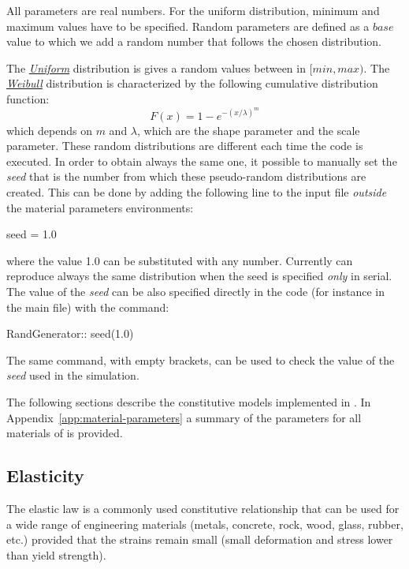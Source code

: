 All parameters are real numbers. For the uniform distribution, minimum
and maximum values have to be specified.
Random parameters are defined as a $base$ value to which we add a random number
that follows the chosen distribution.

The
\href{http://en.wikipedia.org/wiki/Uniform\_distribution\_(continuous)}{\emph{Uniform}}
distribution is gives a random values between in $[min, max)$. The
\href{http://en.wikipedia.org/wiki/Weibull\_distribution}{\emph{Weibull}}
distribution is characterized by the following cumulative distribution
function:
\begin{equation}
  F(x) = 1- e^{-\left({x/\lambda}\right)^m}
\end{equation}
which depends on $m$ and $\lambda$, which are the shape parameter and
the scale parameter. These random distributions are different each
time the code is executed. In order to obtain always the same one, it
possible to manually set the \emph{seed} that is the number from which
these pseudo-random distributions are created. This can be done by
adding the following line to the input file \emph{outside} the
material parameters environments:
\begin{cpp}
  seed = 1.0
\end{cpp}
where the value 1.0 can be substituted with any number. Currently
\akantu can reproduce always the same distribution when the seed is
specified \emph{only} in serial. The value of the \emph{seed} can be
also specified directly in the code (for instance in the main file)
with the command:
\begin{cpp}
  RandGenerator:: seed(1.0)
\end{cpp}
The same command, with empty brackets, can be used to check the value
of the \emph{seed} used in the simulation.

The following sections describe the constitutive models implemented in
\akantu. In Appendix~\ref{app:material-parameters} a summary of the
parameters for all materials of \akantu is provided.


\subsection{Elasticity}

The elastic law is a commonly used constitutive relationship that can be used
for a wide range of engineering materials (\eg metals, concrete, rock, wood,
glass, rubber, etc.) provided that the strains remain small (\ie small
deformation and stress lower than yield strength).

